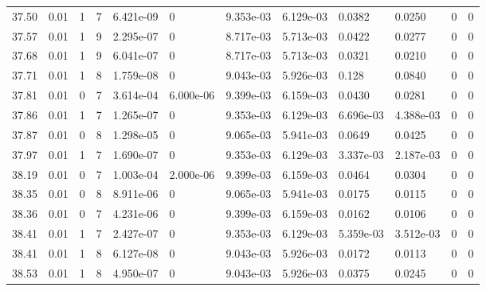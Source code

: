 \documentclass[preview]{standalone}
\begin{document}
{{{{{{{{{{{{{\begin{tabular}{L{1.2cm}C{1.2cm} C{0.3cm}C{0.5cm} C{1.4cm}C{1.4cm} C{1.4cm}C{1.4cm} C{1.6cm}C{1.6cm} C{1.6cm}C{1.6cm}}
  37.50  &  0.01  & 1     &  7 &  6.421e-09  & 0  &  9.353e-03&   6.129e-03& 0.0382 & 0.0250   &  0 & 0  \\ 
  37.57  &  0.01  & 1     &  9 &  2.295e-07  & 0  &  8.717e-03&   5.713e-03& 0.0422 & 0.0277   &  0 & 0  \\ 
  37.68  &  0.01  & 1     &  9 &  6.041e-07  & 0  &  8.717e-03&   5.713e-03& 0.0321 & 0.0210   &  0 & 0  \\ 
  37.71  &  0.01  & 1     &  8 &  1.759e-08  & 0  &  9.043e-03&   5.926e-03& 0.128 & 0.0840   &  0 & 0  \\ 
  37.81  &  0.01  & 0     &  7 &  3.614e-04  & 6.000e-06  &  9.399e-03&   6.159e-03& 0.0430 & 0.0281   &  0 & 0  \\ 
  37.86  &  0.01  & 1     &  7 &  1.265e-07  & 0  &  9.353e-03&   6.129e-03& 6.696e-03 & 4.388e-03   &  0 & 0  \\ 
  37.87  &  0.01  & 0     &  8 &  1.298e-05  & 0  &  9.065e-03&   5.941e-03& 0.0649 & 0.0425   &  0 & 0  \\ 
  37.97  &  0.01  & 1     &  7 &  1.690e-07  & 0  &  9.353e-03&   6.129e-03& 3.337e-03 & 2.187e-03   &  0 & 0  \\ 
  38.19  &  0.01  & 0     &  7 &  1.003e-04  & 2.000e-06  &  9.399e-03&   6.159e-03& 0.0464 & 0.0304   &  0 & 0  \\ 
  38.35  &  0.01  & 0     &  8 &  8.911e-06  & 0  &  9.065e-03&   5.941e-03& 0.0175 & 0.0115   &  0 & 0  \\ 
  38.36  &  0.01  & 0     &  7 &  4.231e-06  & 0  &  9.399e-03&   6.159e-03& 0.0162 & 0.0106   &  0 & 0  \\ 
  38.41  &  0.01  & 1     &  7 &  2.427e-07  & 0  &  9.353e-03&   6.129e-03& 5.359e-03 & 3.512e-03   &  0 & 0  \\ 
  38.41  &  0.01  & 1     &  8 &  6.127e-08  & 0  &  9.043e-03&   5.926e-03& 0.0172 & 0.0113   &  0 & 0  \\ 
  38.53  &  0.01  & 1     &  8 &  4.950e-07  & 0  &  9.043e-03&   5.926e-03& 0.0375 & 0.0245   &  0 & 0  \\ 
\hline 
\end{tabular} 

}}}}}}}}}}}}}
\end{document}
